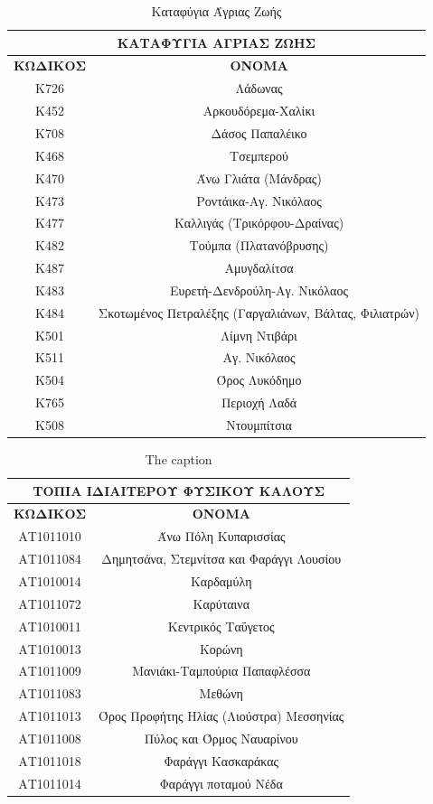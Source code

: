 \documentclass[12pt]{article}
\begin{document}
	\begin{table}[H]
		\centering
		\begin{tabular}{|c|c|}
			\hline
			\multicolumn{2}{|c|}{\textbf{ΚΑΤΑΦΥΓΙΑ ΑΓΡΙΑΣ ΖΩΗΣ}} \\ \hline
			\textbf{ΚΩΔΙΚΟΣ} & \textbf{ΟΝΟΜΑ} \\ \hline
			Κ726 & Λάδωνας \\ \hline
			Κ452 & Αρκουδόρεμα-Χαλίκι \\ \hline
			Κ708 & Δάσος Παπαλέικο \\ \hline
			Κ468 & Τσεμπερού \\ \hline
			Κ470 & Άνω Γλιάτα (Μάνδρας) \\ \hline
			Κ473 & Ροντάικα-Αγ. Νικόλαος \\ \hline
			Κ477 & Καλλιγάς (Τρικόρφου-Δραίνας) \\ \hline
			Κ482 & Τούμπα (Πλατανόβρυσης) \\ \hline
			Κ487 & Αμυγδαλίτσα \\ \hline
			Κ483 & Ευρετή-Δενδρούλη-Αγ. Νικόλαος \\ \hline
			Κ484 & Σκοτωμένος Πετραλέξης (Γαργαλιάνων, Βάλτας, Φιλιατρών) \\ \hline
			Κ501 & Λίμνη Ντιβάρι \\ \hline
			Κ511 & Αγ. Νικόλαος \\ \hline
			Κ504 & Όρος Λυκόδημο \\ \hline
			Κ765 & Περιοχή Λαδά \\ \hline
			Κ508 & Ντουμπίτσια \\ \hline
		\end{tabular}
		\caption{Καταφύγια Άγριας Ζωής}
		\label{The label}
	\end{table}
	
	\begin{table}[H]
		\centering
		\begin{tabular}{|c||c|}
			\hline
			\multicolumn{2}{|c|}{\textbf{ΤΟΠΙΑ ΙΔΙΑΙΤΕΡΟΥ ΦΥΣΙΚΟΥ ΚΑΛΟΥΣ}} \\ \hline
			\textbf{ΚΩΔΙΚΟΣ} & \textbf{ΟΝΟΜΑ} \\ \hline
			ΑΤ1011010 & Άνω Πόλη Κυπαρισσίας \\ \hline
			ΑΤ1011084 & Δημητσάνα, Στεμνίτσα και Φαράγγι Λουσίου \\ \hline
			ΑΤ1010014 & Καρδαμύλη \\ \hline
			ΑΤ1011072 & Καρύταινα \\ \hline
			ΑΤ1010011 & Κεντρικός Ταΰγετος \\ \hline
			ΑΤ1010013 & Κορώνη \\ \hline
			ΑΤ1011009 & Μανιάκι-Ταμπούρια Παπαφλέσσα \\ \hline
			ΑΤ1011083 & Μεθώνη \\ \hline
			ΑΤ1011013 & Όρος Προφήτης Ηλίας (Λιούστρα) Μεσσηνίας \\ \hline
			ΑΤ1011008 & Πύλος και Όρμος Ναυαρίνου \\ \hline
			ΑΤ1011018 & Φαράγγι Κασκαράκας \\ \hline
			ΑΤ1011014 & Φαράγγι ποταμού Νέδα \\ \hline
		\end{tabular}
		\caption{The caption}
		\label{The label}
	\end{table}
	
\end{document}

